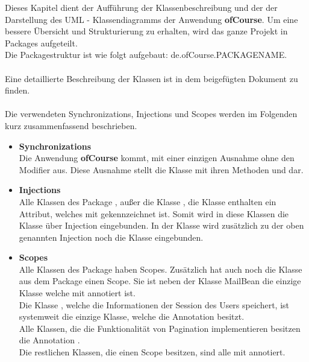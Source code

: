 	Dieses Kapitel dient der Aufführung der Klassenbeschreibung und der der Darstellung des UML - Klassendiagramms der Anwendung \textbf{ofCourse}.
	Um eine bessere Übersicht und Strukturierung zu erhalten, wird das ganze Projekt in Packages aufgeteilt.\\
	Die Packagestruktur ist wie folgt aufgebaut: de.ofCourse.PACKAGENAME.\\
	\ \\
	Eine detaillierte Beschreibung der Klassen ist in dem beigefügten Dokument  zu finden.\\
	\ \\
	Die verwendeten Synchronizations, Injections und Scopes werden im Folgenden kurz zusammenfassend
	beschrieben.\\
	\begin{itemize}
		\item \textbf{Synchronizations}\\
		Die Anwendung \textbf{ofCourse} kommt, mit einer einzigen Ausnahme ohne den Modifier  aus. Diese Ausnahme stellt die Klasse  mit ihren Methoden   und  dar.
		\item \textbf{Injections}\\
		Alle Klassen des Package , außer die Klasse , die Klasse
		  enthalten ein  Attribut, welches mit  gekennzeichnet
		ist. Somit wird in diese Klassen die  Klasse
		über Injection eingebunden.
		In der Klasse  wird zusätzlich zu der oben genannten Injection noch die Klasse 
		eingebunden.
		\item \textbf{Scopes} \\
		Alle Klassen des Package  haben Scopes. Zusätzlich hat auch noch die Klasse  aus dem Package  einen Scope. Sie ist neben der Klasse {MailBean} die einzige Klasse welche mit  annotiert ist.\\ Die Klasse , welche die Informationen der Session des Users speichert, ist systemweit die einzige Klasse, welche die Annotation   besitzt.\\ Alle Klassen, die die Funktionalität von Pagination implementieren besitzen die Annotation .\\ Die restlichen Klassen, die einen Scope besitzen, sind alle mit  annotiert.
	\end{itemize}
	
